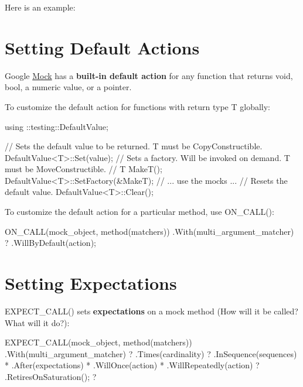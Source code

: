 Here is an example\+: 


\section*{Setting Default Actions}

Google \hyperlink{class_mock}{Mock} has a {\bfseries built-\/in default action} for any function that returns {\ttfamily void}, {\ttfamily bool}, a numeric value, or a pointer.

To customize the default action for functions with return type {\ttfamily T} globally\+: 
\begin{DoxyCode}
using ::testing::DefaultValue;

// Sets the default value to be returned. T must be CopyConstructible.
DefaultValue<T>::Set(value);
// Sets a factory. Will be invoked on demand. T must be MoveConstructible.
//   T MakeT();
DefaultValue<T>::SetFactory(&MakeT);
// ... use the mocks ...
// Resets the default value.
DefaultValue<T>::Clear();
\end{DoxyCode}


To customize the default action for a particular method, use {\ttfamily O\+N\+\_\+\+C\+A\+L\+L()}\+: 
\begin{DoxyCode}
ON\_CALL(mock\_object, method(matchers))
    .With(multi\_argument\_matcher)  ?
    .WillByDefault(action);
\end{DoxyCode}


\section*{Setting Expectations}

{\ttfamily E\+X\+P\+E\+C\+T\+\_\+\+C\+A\+L\+L()} sets {\bfseries expectations} on a mock method (How will it be called? What will it do?)\+: 
\begin{DoxyCode}
EXPECT\_CALL(mock\_object, method(matchers))
    .With(multi\_argument\_matcher)  ?
    .Times(cardinality)            ?
    .InSequence(sequences)         *
    .After(expectations)           *
    .WillOnce(action)              *
    .WillRepeatedly(action)        ?
    .RetiresOnSaturation();        ?
\end{DoxyCode}


